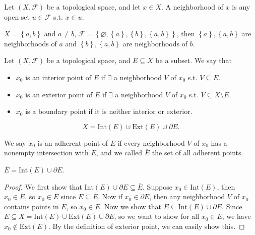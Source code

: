 \begin{definition}[Neighborhood] \label{def: neighborhood}
    Let \((X, \mathcal{F} )\) be a topological space, and let \(x \in X\). A neighborhood of \(x\) is any open set \(u \in \mathcal{F} \) s.t. \(x \in u\).     
\end{definition}

\begin{eg}
    \(X = \left\{ a, b \right\} \) and \(a \neq b\), \(\mathcal{F} = \left\{ \varnothing , \left\{ a \right\}, \left\{ b \right\}, \left\{ a, b \right\}    \right\} \), then \(\left\{ a \right\}, \left\{ a, b \right\}  \) are neighborhoods of \(a\) and \(\left\{ b \right\}, \left\{ a, b \right\}  \) are neighborhoods of \(b\).      
\end{eg}

\begin{definition}
    Let \((X, \mathcal{F} )\) be a topological space, and \(E \subseteq X\) be a subset. We say that 
    \begin{itemize}
        \item \(x_0\) is an interior point of \(E\) if \(\exists \) a neighborhood \(V\) of \(x_0\) s.t. \(V \subseteq E\). 
        \item \(x_0\) is an exterior point of \(E\) if \(\exists \) a neighborhood \(V\) of \(x_0\) s.t. \(V \subseteq X \setminus E\). 
        \item \(x_0\) is a boundary point if it is neither interior or exterior.             
    \end{itemize}  
\end{definition}

\begin{corollary}
    \[
        X = \mathrm{Int}(E) \cupdot \mathrm{Ext}(E) \cupdot \partial E.  
    \]
\end{corollary}

\begin{definition} \label{def: adherent point}
    We say \(x_0\) is an adherent point of \(E\) if every neighborhood \(V\) of \(x_0\) has a nonempty intersection with \(E\), and we called \(\overline{E} \) the set of all adherent points.     
\end{definition}

\begin{corollary}
    \(\overline{E} = \mathrm{Int}(E) \cup \partial E  \). 
\end{corollary}
\begin{proof}
    We first show that \(\mathrm{Int}(E) \cup \partial E \subseteq \overline{E}  \). Suppose \(x_0 \in \mathrm{Int}(E) \), then \(x_0 \in E\), so \(x_0 \in \overline{E} \) since \(E \subseteq \overline{E} \). Now if \(x_0 \in \partial E\), then any neighborhood \(V\) of \(x_0\) contains points in \(E\), so \(x_0 \in \overline{E} \).  
    Now we show that \(\overline{E} \subseteq \mathrm{Int}(E) \cup \partial E \). Since \(\overline{E} \subseteq X = \mathrm{Int}(E) \cup \mathrm{Ext}(E) \cup \partial E  \), so we want to show for all \(x_0 \in \overline{E} \), we have \(x_0 \notin \mathrm{Ext}(E) \). By the definition of exterior point, we can easily show this.    
\end{proof}

